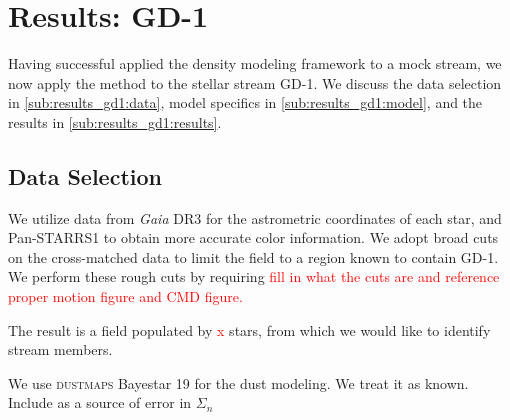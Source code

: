 \documentclass[twocolumn]{aastex631}
\newcommand{\package}[1]{\textsc{#1}}
\newcommand{\TODO}[1]{{\textcolor{red}{#1}}}
\newcommand{\JN}[1]{\TODO{#1}}
\begin{document}
    


\section{Results: GD-1} \label{sec:results_gd1}

    Having successful applied the density modeling framework to a
    mock stream, we now apply the method to the stellar stream GD-1.
    We
    discuss the data selection in \autoref{sub:results_gd1:data},
    model specifics in \autoref{sub:results_gd1:model},
    and the results in \autoref{sub:results_gd1:results}.

    \subsection{Data Selection} \label{sub:results_gd1:data}


        We utilize data from {\it Gaia} DR3 for the astrometric coordinates of
        each star, and Pan-STARRS1 to obtain more accurate color information. We
        adopt broad cuts on the cross-matched data to limit the field to a
        region known to contain GD-1. We perform these rough cuts by requiring
        \JN{fill in what the cuts are and reference proper motion figure and CMD
        figure.} 

        The result is a field populated by \JN{x} stars, from which we would
        like to identify stream members.

            We use \package{dustmaps} Bayestar 19 for the dust modeling. We treat it as known. Include as a source of error in $\Sigma_n$
\end{document}
